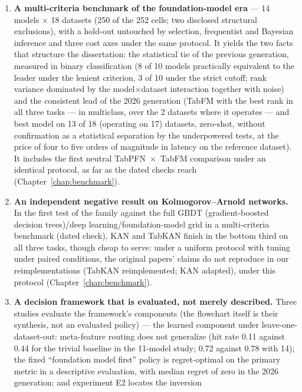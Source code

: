 \begin{enumerate}
  \item \textbf{A multi-criteria benchmark of the foundation-model
    era} --- 14 models $\times$ 18 datasets (250 of the 252 cells;
    two disclosed structural exclusions), with a hold-out untouched
    by selection, frequentist and Bayesian inference and three cost
    axes under the same protocol. It yields the two facts that
    structure the dissertation: the statistical tie of the previous
    generation, measured in binary classification (8 of 10 models
    practically equivalent to the leader
    under the lenient criterion, 3 of 10 under the strict cutoff;
    rank variance dominated by the model$\times$dataset interaction
    together with noise)
    and the consistent lead of the 2026 generation (TabFM with the
    best rank in all three tasks --- in multiclass, over the 2
    datasets where it operates --- and best model on 13 of 18
    (operating on 17)
    datasets, zero-shot, without confirmation as a statistical
    separation by the underpowered tests, at the price of four to
    five orders of magnitude in latency on the reference dataset). It includes the first
    neutral TabPFN~$\times$~TabFM comparison under an identical
    protocol, as far as the dated checks reach
    (Chapter~\ref{chap:benchmark}).
  \item \textbf{An independent negative result on Kolmogorov--Arnold
    networks.} In the first test of the family against the full
    GBDT (gradient-boosted decision trees)/deep
    learning/foundation-model grid in a multi-criteria benchmark
    (dated check), KAN and TabKAN finish in the bottom third on all
    three tasks, though cheap to serve: under a uniform protocol
    with tuning under paired conditions, the original papers' claims
    do not reproduce in our reimplementations (TabKAN reimplemented;
    KAN adapted), under this protocol
    (Chapter~\ref{chap:benchmark}).
  \item \textbf{A decision framework that is evaluated, not merely
    described.} Three studies evaluate the framework's components (the flowchart
    itself is their synthesis, not an evaluated policy) --- the
    learned component under leave-one-dataset-out: meta-feature
    routing does not generalize (hit rate 0.11 against 0.44 for the
    trivial baseline in the 11-model study; 0.72 against 0.78 with
    14); the fixed ``foundation model first'' policy is
    regret-optimal on the primary metric in a descriptive
    evaluation, with median regret of zero
    in the 2026 generation; and experiment E2 locates the inversion

\end{enumerate}

